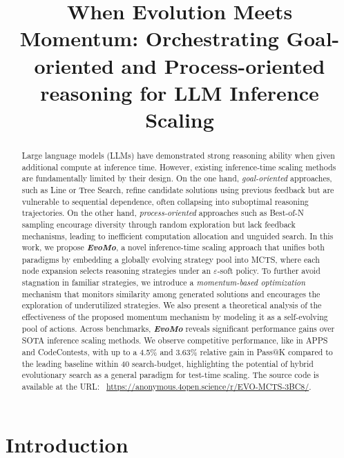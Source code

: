 \documentclass{article} %
\title{When Evolution Meets Momentum: Orchestrating Goal-oriented and Process-oriented reasoning for LLM Inference Scaling}
\theoremstyle{definition}
\theoremstyle{remark}
\begin{document}
\maketitle

\begin{abstract}





Large language models (LLMs) have demonstrated strong reasoning ability when given additional compute at inference time. However, existing inference-time scaling methods are fundamentally limited by their design. On the one hand, \textit{goal-oriented} approaches, such as Line or Tree Search, refine candidate solutions using previous feedback but are vulnerable to sequential dependence, often collapsing into suboptimal reasoning trajectories. On the other hand, \textit{process-oriented} approaches such as Best-of-N sampling encourage diversity through random exploration but lack feedback mechanisms, leading to inefficient computation allocation and unguided search. In this work, we propose \textbf{\textit{EvoMo}}, a novel inference-time scaling approach that unifies both paradigms by embedding a globally evolving strategy pool into MCTS, where each node expansion selects reasoning strategies under an $\varepsilon$-soft policy. To further avoid stagnation in familiar strategies, we introduce a \textit{momentum-based optimization} mechanism that monitors similarity among generated solutions and encourages the exploration of underutilized strategies. We also present a theoretical analysis of the effectiveness of the proposed momentum mechanism by modeling it as a self-evolving pool of actions. Across benchmarks, \textbf{\textit{EvoMo}} reveals significant performance gains over SOTA inference scaling methods. We observe competitive performance, like in APPS and CodeContests, with up to a 4.5\% and 3.63\% relative gain in Pass@K compared to the leading baseline within 40 search-budget, highlighting the potential of hybrid evolutionary search as a general paradigm for test-time scaling. The source code is available at the URL: ~\url{https://anonymous.4open.science/r/EVO-MCTS-3BC8/}.


\end{abstract}
\section{Introduction}
\label{intro}
\end{document}
